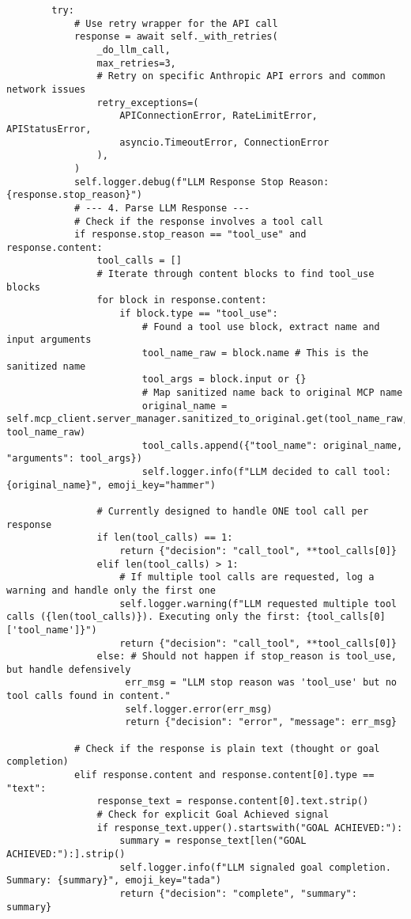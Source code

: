 \documentclass[12pt,a4paper]{article}
\begin{document}
\begin{pageablecode}
\begin{verbatim}
        try:
            # Use retry wrapper for the API call
            response = await self._with_retries(
                _do_llm_call,
                max_retries=3,
                # Retry on specific Anthropic API errors and common network issues
                retry_exceptions=(
                    APIConnectionError, RateLimitError, APIStatusError,
                    asyncio.TimeoutError, ConnectionError
                ),
            )
            self.logger.debug(f"LLM Response Stop Reason: {response.stop_reason}")
            # --- 4. Parse LLM Response ---
            # Check if the response involves a tool call
            if response.stop_reason == "tool_use" and response.content:
                tool_calls = []
                # Iterate through content blocks to find tool_use blocks
                for block in response.content:
                    if block.type == "tool_use":
                        # Found a tool use block, extract name and input arguments
                        tool_name_raw = block.name # This is the sanitized name
                        tool_args = block.input or {}
                        # Map sanitized name back to original MCP name
                        original_name = self.mcp_client.server_manager.sanitized_to_original.get(tool_name_raw, tool_name_raw)
                        tool_calls.append({"tool_name": original_name, "arguments": tool_args})
                        self.logger.info(f"LLM decided to call tool: {original_name}", emoji_key="hammer")

                # Currently designed to handle ONE tool call per response
                if len(tool_calls) == 1:
                    return {"decision": "call_tool", **tool_calls[0]}
                elif len(tool_calls) > 1:
                    # If multiple tool calls are requested, log a warning and handle only the first one
                    self.logger.warning(f"LLM requested multiple tool calls ({len(tool_calls)}). Executing only the first: {tool_calls[0]['tool_name']}")
                    return {"decision": "call_tool", **tool_calls[0]}
                else: # Should not happen if stop_reason is tool_use, but handle defensively
                     err_msg = "LLM stop reason was 'tool_use' but no tool calls found in content."
                     self.logger.error(err_msg)
                     return {"decision": "error", "message": err_msg}

            # Check if the response is plain text (thought or goal completion)
            elif response.content and response.content[0].type == "text":
                response_text = response.content[0].text.strip()
                # Check for explicit Goal Achieved signal
                if response_text.upper().startswith("GOAL ACHIEVED:"):
                    summary = response_text[len("GOAL ACHIEVED:"):].strip()
                    self.logger.info(f"LLM signaled goal completion. Summary: {summary}", emoji_key="tada")
                    return {"decision": "complete", "summary": summary}


\end{verbatim}
\end{pageablecode}
\end{document}
